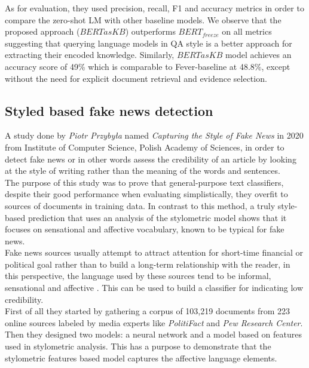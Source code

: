 \documentclass[10pt, english]{report}
\begin{document}
As for evaluation, they used precision, recall, F1 and accuracy metrics in order to compare the zero-shot LM with other baseline models. We observe that the proposed approach ($BERTasKB$) outperforms $BERT_{freeze}$ on all metrics suggesting that querying language models in QA style is a better approach for extracting their encoded knowledge. Similarly, $BERTasKB$ model achieves an accuracy score of 49\% which is comparable to Fever-baseline at 48.8\%, except without the need for explicit document retrieval and evidence selection.


\subsection{Styled based fake news detection \cite{przybyla2020capturing}}
A study done by \textit{Piotr Przybyła} named \textit{Capturing the Style of Fake News} in 2020 from Institute of Computer Science, Polish Academy of Sciences, in order to detect fake news or in other words assess the credibility of an article by looking at the style of writing rather than the meaning of the words and sentences.\\
The purpose of this study was to prove that general-purpose text classifiers, despite their good performance when evaluating simplistically, they overfit to sources of documents in training data. In contrast to this method, a truly style-based prediction that uses an analysis of the stylometric model shows that it focuses on sensational and affective vocabulary, known to be typical for fake news.\\

Fake news sources usually attempt to attract attention for short-time financial or political goal \cite{allcott2017social} rather than to build a long-term relationship with the reader, in this perspective, the language used by these sources tend to be informal, sensational and affective \cite{bakir2017fake}. This can be used to build a classifier for indicating low credibility.\\

First of all they started by gathering a corpus of 103,219 documents from 223 online sources labeled by media experts like \textit{PolitiFact} and \textit{Pew Research Center}. Then they designed two models: a neural network and a model based on features used in stylometric analysis. This has a purpose to demonstrate that the stylometric features based model captures the affective language elements.\\
\end{document}
